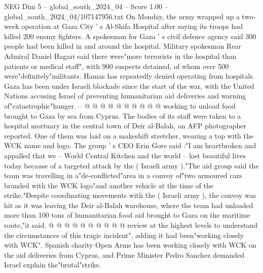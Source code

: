 \begin{textsample}{NEG Dim 5 – global\_south\_2024\_04 – Score 1.00 – global\_south\_2024\_04/107147956.txt}
On Monday, the army wrapped up a two-week operation at Gaza City ' s Al-Shifa Hospital after saying its troops had killed 200 enemy fighters.
A spokesman for Gaza ' s civil defence agency said 300 people had been killed in and around the hospital.
Military spokesman Rear Admiral Daniel Hagari said there were"more terrorists in the hospital than patients or medical staff", with 900 suspects detained, of whom over 500 were"definitely"militants.
Hamas has repeatedly denied operating from hospitals.
Gaza has been under Israeli blockade since the start of the war, with the United Nations accusing Israel of preventing humanitarian aid deliveries and warning of"catastrophic"hunger. -- @ @ @ @ @ @ @ @ @ @ working to unload food brought to Gaza by sea from Cyprus.
The bodies of its staff were taken to a hospital mortuary in the central town of Deir al-Balah, an AFP photographer reported.
One of them was laid on a makeshift stretcher, wearing a top with the WCK name and logo.
The group ' s CEO Erin Gore said :"I am heartbroken and appalled that we -- World Central Kitchen and the world -- lost beautiful lives today because of a targeted attack by the ( Israeli army )."The aid group said the team was travelling in a"de-conflicted"area in a convoy of"two armoured cars branded with the WCK logo"and another vehicle at the time of the strike."Despite coordinating movements with the ( Israeli army ), the convoy was hit as it was leaving the Deir al-Balah warehouse, where the team had unloaded more than 100 tons of humanitarian food aid brought to Gaza on the maritime route,"it said. @ @ @ @ @ @ @ @ @ @ review at the highest levels to understand the circumstances of this tragic incident", adding it had been"working closely with WCK".
Spanish charity Open Arms has been working closely with WCK on the aid deliveries from Cyprus, and Prime Minister Pedro Sanchez demanded Israel explain the"brutal"strike.

\end{textsample}
